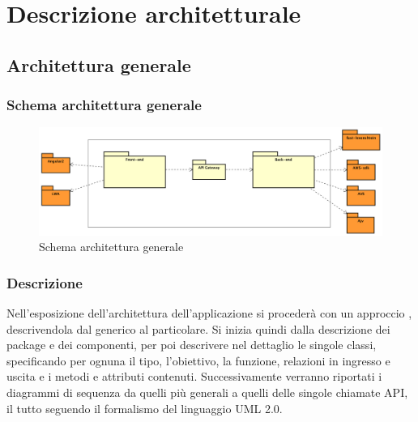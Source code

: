 \documentclass[../DefinizioneDiProdotto_v3.0.0.tex]{subfiles}
\begin{document}
\section{Descrizione architetturale}

\subsection{Architettura generale}
\subsubsection{Schema architettura generale}
\begin{figure}[!h]
	\centering
	\includegraphics[width=\textwidth]{Architettura/AltoLivello.png}
	\caption{Schema architettura generale}
\end{figure}

\subsubsection{Descrizione}
Nell'esposizione dell'architettura dell'applicazione si procederà con un approccio , descrivendola dal generico al particolare. Si inizia quindi dalla descrizione dei package e dei componenti, per poi descrivere nel dettaglio le singole classi, specificando per ognuna il tipo, l'obiettivo, la funzione, relazioni in ingresso e uscita e i metodi e attributi contenuti. Successivamente verranno riportati i diagrammi di sequenza da quelli più generali a quelli delle singole chiamate API, il tutto seguendo il formalismo del linguaggio UML 2.0.
\end{document}
